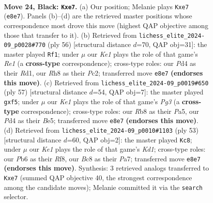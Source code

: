 \documentclass[11pt]{article}
\begin{document}
\clearpage

\begin{figure}[p]\centering
\begin{subfigure}{0.46\textwidth}\centering
\resizebox{\linewidth}{!}{%
\newchessgame
\chessboard[
  setfen={1rb1k2r/4B1pp/1p6/p2Q4/3p3P/8/PP3PP1/RN4K1 b - - 0 24},
  showmover=false,
  pgfstyle=straightmove, color=movearrow, markmove={e8-e7}
]}
\caption{}
\end{subfigure}\hfill
\begin{subfigure}{0.46\textwidth}\centering
\resizebox{\linewidth}{!}{%
\newchessgame
\chessboard[
  setfen={4k2r/1p3ppp/p7/4pP2/1PP5/3Kbq2/2P4P/3RR3 w k - 0 29},
  showmover=false,
  pgfstyle=straightmove, color=movearrow, markmove={e1-f1}
]}
\caption{}
\end{subfigure}
\\[4pt]
\begin{subfigure}{0.46\textwidth}\centering
\resizebox{\linewidth}{!}{%
\newchessgame
\chessboard[
  setfen={r5k1/1p6/2p3pp/p3bQ2/8/1P4PP/P4PB1/3R2K1 b - - 0 29},
  showmover=false,
  pgfstyle=straightmove, color=movearrow, markmove={g6-f5}
]}
\caption{}
\end{subfigure}\hfill
\begin{subfigure}{0.46\textwidth}\centering
\resizebox{\linewidth}{!}{%
\newchessgame
\chessboard[
  setfen={r2k1r2/ppp1b1p1/7p/2P1Bp2/8/PP6/5PPP/3Q2K1 b - - 0 27},
  showmover=false,
  pgfstyle=straightmove, color=movearrow, markmove={d8-c8}
]}
\caption{}
\end{subfigure}
\caption{\textbf{Move 24, Black: \texttt{Kxe7}.} (a) Our position; Melanie plays \texttt{Kxe7} (\texttt{e8e7}). Panels (b)--(d) are the retrieved master positions whose correspondence most drove this move (highest QAP objective among those that transfer to it). (b) Retrieved from \texttt{lichess\_elite\_2024-09\_p0028\#770} (ply 56) [structural distance $d$=70, QAP obj=31]: the master played \texttt{Rf1}; under $\mu$ our \emph{Ke1} plays the role of that game's \emph{Re1} (a \textbf{cross-type} correspondence); cross-type roles: our \emph{P}d4 as their \emph{R}d1, our \emph{R}h8 as their \emph{P}c2; transferred move \texttt{e8e7} \textbf{(endorses this move)}. (c) Retrieved from \texttt{lichess\_elite\_2024-09\_p0019\#650} (ply 57) [structural distance $d$=54, QAP obj=7]: the master played \texttt{gxf5}; under $\mu$ our \emph{Ke1} plays the role of that game's \emph{Pg3} (a \textbf{cross-type} correspondence); cross-type roles: our \emph{R}b8 as their \emph{P}a5, our \emph{P}d4 as their \emph{B}e5; transferred move \texttt{e8e7} \textbf{(endorses this move)}. (d) Retrieved from \texttt{lichess\_elite\_2024-09\_p0010\#1103} (ply 53) [structural distance $d$=60, QAP obj=2]: the master played \texttt{Kc8}; under $\mu$ our \emph{Ke1} plays the role of that game's \emph{Kd1}; cross-type roles: our \emph{P}b6 as their \emph{R}f8, our \emph{B}c8 as their \emph{P}a7; transferred move \texttt{e8e7} \textbf{(endorses this move)}. Synthesis: 3 retrieved analogs transferred to \texttt{Kxe7} (summed QAP objective 40, the strongest correspondence among the candidate moves); Melanie committed it via the \texttt{search} selector.}
\label{fig:thought-m47}
\end{figure}
\end{document}
